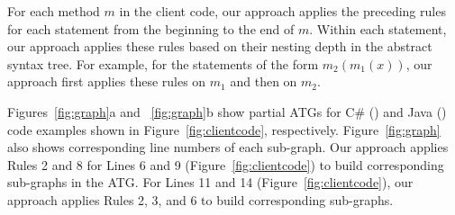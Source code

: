 For each method $m$ in the client code, our approach applies the preceding
rules for each statement from the beginning to the end of $m$.
Within each statement, our approach applies these rules based on
their nesting depth in the abstract syntax tree. For example,
for the statements of the form $m_2(m_1(x))$, our approach first applies
these rules on $m_1$ and then on $m_2$.

Figures~\ref{fig:graph}a and ~\ref{fig:graph}b show partial ATGs for
C\# () and Java ()
code examples shown in Figure~\ref{fig:clientcode}, respectively.
Figure~\ref{fig:graph} also shows corresponding line numbers of each
sub-graph. Our approach applies Rules 2 and 8 for Lines 6 and 9
(Figure~\ref{fig:clientcode}) to build corresponding sub-graphs in
the ATG. For Lines 11 and 14 (Figure~\ref{fig:clientcode}), our
approach applies Rules 2, 3, and 6 to build corresponding
sub-graphs.


